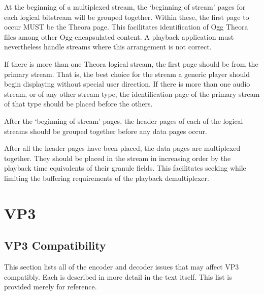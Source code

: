\documentclass[9pt,letterpaper]{book}
\numberwithin{equation}{chapter}
\numberwithin{figure}{chapter}
\numberwithin{table}{chapter}
\begin{document}
At the beginning of a multiplexed stream, the `beginning of stream'
 pages for each logical bitstream will be grouped together.
Within these, the first page to occur MUST be the Theora page.
This facilitates identification of Ogg Theora files among other
 Ogg-encapsulated content.
A playback application must nevertheless handle streams where this
 arrangement is not correct.

If there is more than one Theora logical stream, the first page should
 be from the primary stream.
That is, the best choice for the stream a generic player should begin
 displaying without special user direction.
If there is more than one audio stream, or of any other stream
 type, the identification page of the primary stream of that type
 should be placed before the others.

After the `beginning of stream' pages, the header pages of each of
 the logical streams should be grouped together before any data pages
 occur.

After all the header pages have been placed,
 the data pages are multiplexed together.
They should be placed in the stream in increasing order by the playback
 time equivalents of their granule fields.
This facilitates seeking while limiting the buffering requirements of the
 playback demultiplexer.

\cleardoublepage
\chapter{VP3}

\section{VP3 Compatibility}
\label{app:vp3-compat}
This section lists all of the encoder and decoder issues that may affect VP3
 compatibly.
Each is described in more detail in the text itself.
This list is provided merely for reference.
\end{document}
